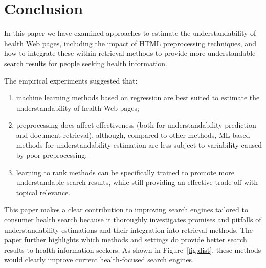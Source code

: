 \section*{Conclusion}
\label{sec:conclusion_doc_analysis}

In this paper we have examined approaches to estimate the understandability of health Web pages, including the impact of HTML preprocessing techniques, and how to integrate these within retrieval methods to provide more understandable search results for people seeking health information. 


The empirical experiments suggested that:

\vspace{-4pt}
\begin{enumerate}[leftmargin=*]
	\item machine learning methods based on regression are best suited to estimate the understandability of health Web pages;
	\item preprocessing does affect effectiveness (both for understandability prediction and document retrieval), although, compared to other methods, ML-based methods for understandability estimation are less subject to variability caused by poor preprocessing;
	\item learning to rank methods can be specifically trained to promote more understandable search results, while still providing an effective trade off with topical relevance.
\end{enumerate} 

This paper makes a clear contribution to improving search engines tailored to consumer health search because it thoroughly investigates promises and pitfalls of understandability estimations and their integration into retrieval methods. The paper further highlights which methods and settings do provide better search results to health information seekers. As shown in Figure~\ref{fig:dist}, these methods would clearly improve current health-focused search engines. 


